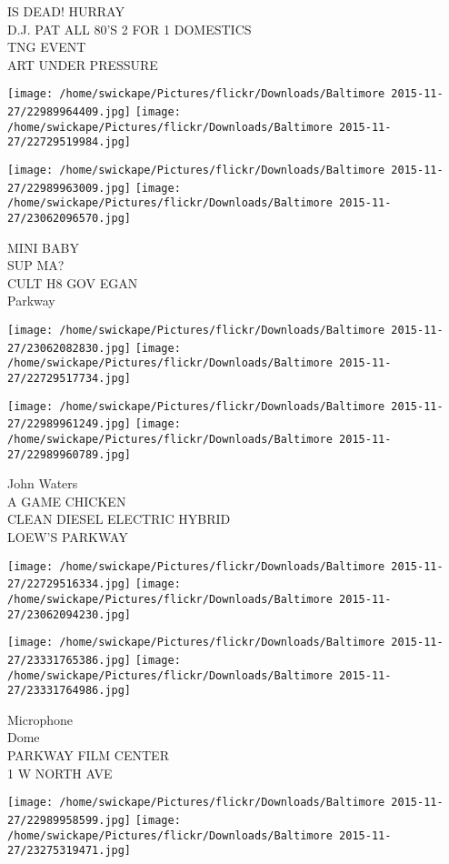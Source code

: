 \documentclass[10pt,letterpaper]{article}
\begin{document}
IS DEAD! HURRAY\\
D.J. PAT ALL 80'S 2 FOR 1 DOMESTICS\\
TNG EVENT\\
ART UNDER PRESSURE
\pagebreak

\texttt{[image: /home/swickape/Pictures/flickr/Downloads/Baltimore 2015-11-27/22989964409.jpg]}
\texttt{[image: /home/swickape/Pictures/flickr/Downloads/Baltimore 2015-11-27/22729519984.jpg]}

\texttt{[image: /home/swickape/Pictures/flickr/Downloads/Baltimore 2015-11-27/22989963009.jpg]}
\texttt{[image: /home/swickape/Pictures/flickr/Downloads/Baltimore 2015-11-27/23062096570.jpg]}

MINI BABY\\
SUP MA?\\
CULT H8 GOV EGAN\\
Parkway
\pagebreak

\texttt{[image: /home/swickape/Pictures/flickr/Downloads/Baltimore 2015-11-27/23062082830.jpg]}
\texttt{[image: /home/swickape/Pictures/flickr/Downloads/Baltimore 2015-11-27/22729517734.jpg]}

\texttt{[image: /home/swickape/Pictures/flickr/Downloads/Baltimore 2015-11-27/22989961249.jpg]}
\texttt{[image: /home/swickape/Pictures/flickr/Downloads/Baltimore 2015-11-27/22989960789.jpg]}

John Waters\\
A GAME CHICKEN\\
CLEAN DIESEL ELECTRIC HYBRID\\
LOEW'S PARKWAY
\pagebreak

\texttt{[image: /home/swickape/Pictures/flickr/Downloads/Baltimore 2015-11-27/22729516334.jpg]}
\texttt{[image: /home/swickape/Pictures/flickr/Downloads/Baltimore 2015-11-27/23062094230.jpg]}

\texttt{[image: /home/swickape/Pictures/flickr/Downloads/Baltimore 2015-11-27/23331765386.jpg]}
\texttt{[image: /home/swickape/Pictures/flickr/Downloads/Baltimore 2015-11-27/23331764986.jpg]}

Microphone\\
Dome\\
PARKWAY FILM CENTER\\
1 W NORTH AVE
\pagebreak

\texttt{[image: /home/swickape/Pictures/flickr/Downloads/Baltimore 2015-11-27/22989958599.jpg]}
\texttt{[image: /home/swickape/Pictures/flickr/Downloads/Baltimore 2015-11-27/23275319471.jpg]}
\end{document}
